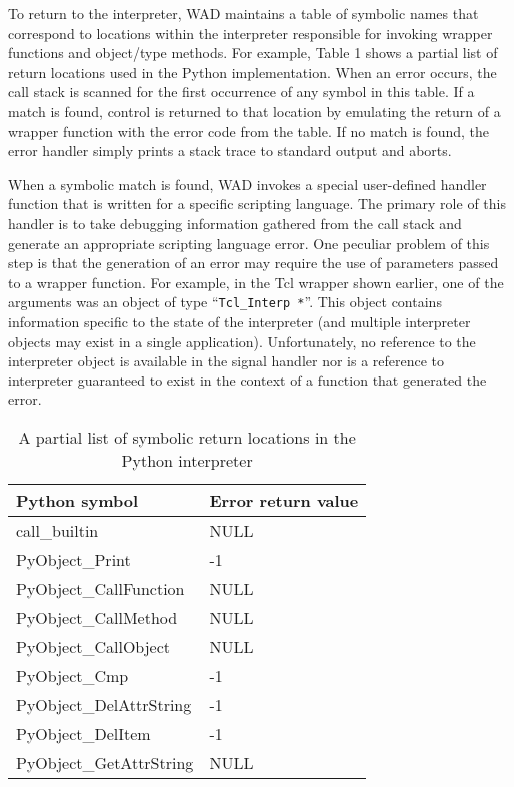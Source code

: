 To return to the interpreter, WAD maintains a table of symbolic names
that correspond to locations within the interpreter
responsible for invoking wrapper functions and object/type methods.
For example, Table 1 shows a partial list of return locations used in
the Python implementation.  When an error occurs, the call stack is
scanned for the first occurrence of any symbol in this table.  If a
match is found, control is returned to that location by emulating the
return of a wrapper function with the error code from the table. If no
match is found, the error handler simply prints a stack trace to
standard output and aborts.

When a symbolic match is found, WAD invokes a special user-defined
handler function that is written for a specific scripting language.
The primary role of this handler is to take debugging information
gathered from the call stack and generate an appropriate scripting
language error.  One peculiar problem of this step is that the
generation of an error may require the use of parameters passed to a
wrapper function.  For example, in the Tcl wrapper shown earlier, one
of the arguments was an object of type ``{\tt Tcl\_Interp *}''.  This
object contains information specific to the state of the interpreter
(and multiple interpreter objects may exist in a single application).
Unfortunately, no reference to the interpreter object is available in the
signal handler nor is a reference to interpreter guaranteed to exist in
the context of a function that generated the error.

\begin{table}[t]
\begin{center}
\begin{tabular}{ll}
Python symbol                 &   Error return value \\ \hline
call\_builtin                 &   NULL \\
PyObject\_Print               & -1 \\
PyObject\_CallFunction        & NULL \\
PyObject\_CallMethod          & NULL \\
PyObject\_CallObject          & NULL \\
PyObject\_Cmp                 & -1 \\
PyObject\_DelAttrString       & -1 \\
PyObject\_DelItem             & -1 \\
PyObject\_GetAttrString       & NULL \\
\end{tabular}
\end{center}
\label{returnpoints}
\caption{A partial list of symbolic return locations in the Python interpreter}
\end{table}

